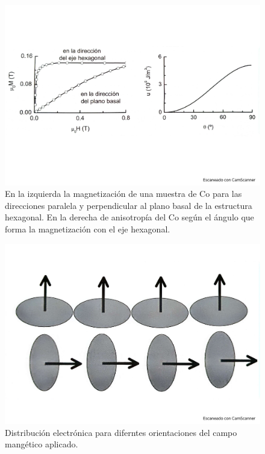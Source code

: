 \begin{figure}[h!] \centering
	\includegraphics[scale=0.35]{Cuerpo/Ch_10/Fotos libro 5.pdf}
	\caption{En la izquierda la magnetización de una muestra de  Co para las direcciones paralela y perpendicular al plano basal de la estructura hexagonal. En la derecha de anisotropía del Co según el ángulo que forma la magnetización con el eje hexagonal.}
	\label{Fig:10-05}
\end{figure}
\begin{figure}[h!] \centering
	\includegraphics[scale=0.35]{Cuerpo/Ch_10/Fotos libro 6.pdf}
	\caption{Distribución electrónica para diferntes orientaciones del campo mangético aplicado.}
	\label{Fig:10-06}
\end{figure}
